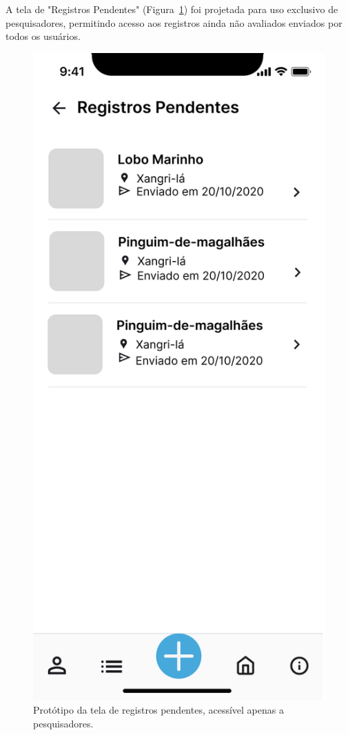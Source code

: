A tela de "Registros Pendentes" (Figura~\ref{fig:prototipo-registros-pendentes}) foi projetada 
para uso exclusivo de pesquisadores, permitindo acesso aos registros ainda não avaliados enviados 
por todos os usuários.

\begin{figure}[H]
    \centering
    \includegraphics[height=0.6\textheight]{imagens/registro-pendente-figma.png}
    \caption{Protótipo da tela de registros pendentes, acessível apenas a pesquisadores.}
    \label{fig:prototipo-registros-pendentes}
\end{figure}


